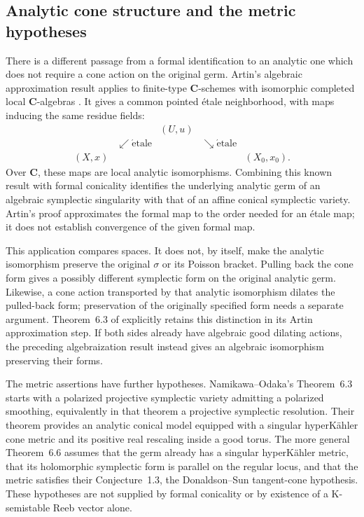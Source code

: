 \subsection{Analytic cone structure and the metric hypotheses}
\label{sec:ytd-local-symplectic-analytic-scope}

There is a different passage from a formal identification to
an analytic one which does not require a cone action on the
original germ. Artin's algebraic approximation result applies
to finite-type $\mathbf C$-schemes with isomorphic completed
local $\mathbf C$-algebras
\cite[Corollary~2.6]{Artin69AlgebraicApproximationPublished}.
It gives a common pointed \'etale neighborhood, with maps
inducing the same residue fields:
\[
\tag{68.23bu}\label{eq:ytd-formal-common-etale}
\begin{array}{ccccc}
 &&(U,u)&&\\
 &\swarrow\scriptstyle{\mathrm{\acute etale}}&&
       \searrow\scriptstyle{\mathrm{\acute etale}}&\\
 (X,x)&&&&(X_0,x_0).
\end{array}
\]
Over $\mathbf C$, these maps are local analytic isomorphisms.
Combining this known result with formal conicality identifies
the underlying analytic germ of an algebraic symplectic
singularity with that of an affine conical symplectic variety.
Artin's proof approximates the formal map to the order needed
for an \'etale map; it does not establish convergence of the
given formal map.

This application compares spaces. It does not, by itself,
make the analytic isomorphism preserve the original
$\sigma$ or its Poisson bracket. Pulling back the cone form
gives a possibly different symplectic form on the original
analytic germ. Likewise, a cone action transported by that
analytic isomorphism dilates the pulled-back form; preservation
of the originally specified form needs a separate argument.
Theorem~6.3 of \cite{NamikawaOdaka26TorusV4} explicitly
retains this distinction in its Artin approximation step.
If both sides already have algebraic good dilating actions,
the preceding algebraization result instead gives an
algebraic isomorphism preserving their forms.

The metric assertions have further hypotheses. Namikawa--Odaka's
Theorem~6.3 starts with a polarized projective symplectic
variety admitting a polarized smoothing, equivalently in that
theorem a projective symplectic resolution. Their theorem
provides an analytic conical model equipped with a singular
hyperK\"ahler cone metric and its positive real rescaling
inside a good torus. The more general Theorem~6.6 assumes
that the germ already has a singular hyperK\"ahler metric,
that its holomorphic symplectic form is parallel on the
regular locus, and that the metric satisfies their
Conjecture~1.3, the Donaldson--Sun tangent-cone hypothesis.
These hypotheses are not supplied by formal conicality
or by existence of a K-semistable Reeb vector alone.

